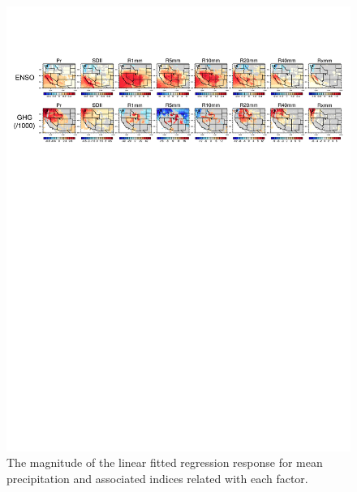 \begin{figure}
\begin{center}
\includegraphics[width=6in]{supplement/wd_lmfit_coef_enso_ghg.pdf}
\caption{The magnitude of the linear fitted regression response for mean precipitation and associated indices related with each factor.}
\end{center}
\label{fig:S7}
\end{figure}


